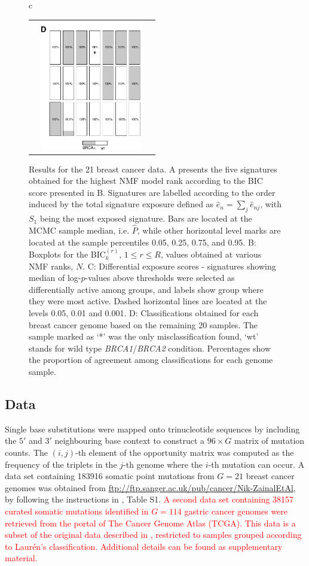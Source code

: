 \documentclass{bioinfo}
\begin{document}
\begin{figure}[htb!]
\begin{tabular}{c}
\begin{tabular}{ccc}
   &
   \includegraphics[width=4.5cm]{figs/Classific}
 \end{tabular}
 \end{tabular}
 \caption{\textrm{%
    Results for the 21 breast cancer data. A presents the five
    signatures obtained for the highest NMF model rank according to the
    BIC score presented in B. Signatures are labelled according to the
    order induced by the total signature exposure defined as $\hat e_n =
    \sum_{j} \hat e_{nj}$, with $S_1$ being the most exposed
    signature. Bars are located at the MCMC sample median,
    i.e. $\widehat P$, while other horizontal level marks are located
    at the sample percentiles 0.05, 0.25, 0.75, and 0.95.
    B: Boxplots for the BIC$^{(r)}_k$, $1 \leq r \leq R$, values
    obtained at various NMF ranks, $N$. C: Differential exposure
    scores - signatures
    showing median of log-$p$-values above thresholds were selected as
    differentially active among groups, and labels show group where they
    were most active.  Dashed horizontal lines are located at
    the levels 0.05, 0.01 and 0.001. D: Classifications
    obtained for each breast cancer genome based on the remaining 20
    samples. The sample marked as `*' was the only
    misclassification found, `wt' stands for wild type
    \emph{BRCA1}/\emph{BRCA2} condition. Percentages show the
    proportion of agreement among classifications for each genome
    sample.
  }
 }\label{fig:bcancer}
\end{figure}
\subsection{Data}
Single base substitutions were mapped onto trinucleotide sequences by
including the $5'$ and $3'$ neighbouring base context to construct
a $96\times G$ matrix of mutation counts.  The $(i,j)$-th element of
the opportunity matrix was computed as the frequency of the triplets
in the $j$-th genome where the $i$-th mutation can occur. A data set
containing 183916 somatic point mutations from $G=21$ breast cancer
genomes was obtained from
\url{ftp://ftp.sanger.ac.uk/pub/cancer/Nik-ZainalEtAl},
by following the instructions in \cite{NCell},
Table S1. \textcolor{red}{A second data set containing 38157 curated
somatic mutations identified in $G=114$ gastric cancer genomes were
retrieved from the portal of The Cancer Genome Atlas (TCGA). This data
is a subset of the original data described in \cite{TCGABass},
restricted to samples grouped according to Laur\'en's
classification. Additional details can be found as supplementary material.}
\end{document}

